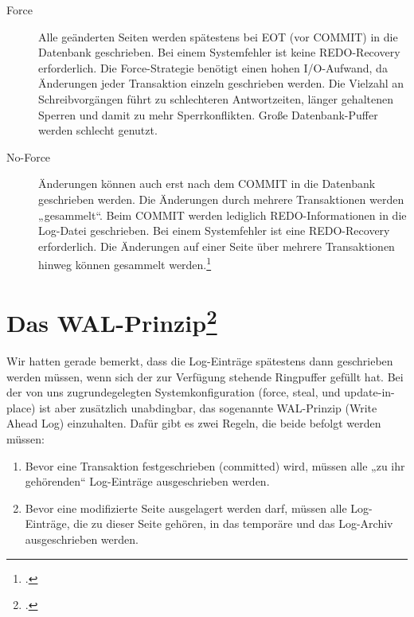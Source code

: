 \documentclass{lehramt-informatik-haupt}
\begin{document}
\begin{description}

\item [Force]

Alle geänderten Seiten werden spätestens bei EOT (vor COMMIT) in die
Datenbank geschrieben. Bei einem Systemfehler ist keine REDO-Recovery
erforderlich. Die Force-Strategie benötigt einen hohen I/O-Aufwand, da
Änderungen jeder Transaktion einzeln geschrieben werden. Die Vielzahl an
Schreibvorgängen führt zu schlechteren Antwortzeiten, länger gehaltenen
Sperren und damit zu mehr Sperrkonflikten. Große Datenbank-Puffer werden
schlecht genutzt.

\item [No-Force]

Änderungen können auch erst nach dem COMMIT in die Datenbank geschrieben
werden. Die Änderungen durch mehrere Transaktionen werden „gesammelt“.
Beim COMMIT werden lediglich REDO-Informationen in die Log-Datei
geschrieben. Bei einem Systemfehler ist eine REDO-Recovery erforderlich.
Die Änderungen auf einer Seite über mehrere Transaktionen hinweg können
gesammelt werden.\footcite[Seite 25]{db:fs:5}
\end{description}

%

\section{Das WAL-Prinzip\footcite[Kapitel 10.3.5 Seite 318]{kemper}}

Wir hatten gerade bemerkt, dass die Log-Einträge spätestens dann
geschrieben werden müssen, wenn sich der zur Verfügung stehende
Ringpuffer gefüllt hat. Bei der von uns zugrundegelegten
Systemkonfiguration (force, steal, und update-in-place) ist aber
zusätzlich unabdingbar, das sogenannte WAL-Prinzip (Write Ahead Log)
einzuhalten. Dafür gibt es zwei Regeln, die beide befolgt werden müssen:

\begin{enumerate}
\item Bevor eine Transaktion festgeschrieben (committed) wird, müssen
alle „zu ihr gehörenden“ Log-Einträge ausgeschrieben werden.

\item Bevor eine modifizierte Seite ausgelagert werden darf, müssen alle
Log-Einträge, die zu dieser Seite gehören, in das temporäre und das
Log-Archiv ausgeschrieben werden.
\end{enumerate}
\end{document}
